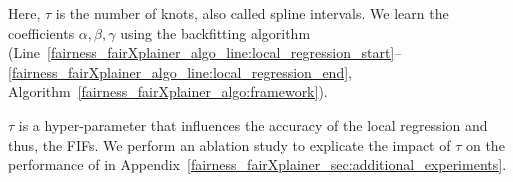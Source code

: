 Here, $ \tau $ is the number of knots, also called spline intervals. We learn the coefficients $ \alpha, \beta, \gamma $ using the backfitting algorithm (Line~\ref{fairness_fairXplainer_algo_line:local_regression_start}--\ref{fairness_fairXplainer_algo_line:local_regression_end}, Algorithm~\ref{fairness_fairXplainer_algo:framework}). 

$\tau$ is a hyper-parameter that influences the accuracy of the local regression and thus, the FIFs. We perform an ablation study to explicate the impact of $\tau$ on the performance of {\fairXplainer} in Appendix~\ref{fairness_fairXplainer_sec:additional_experiments}.

